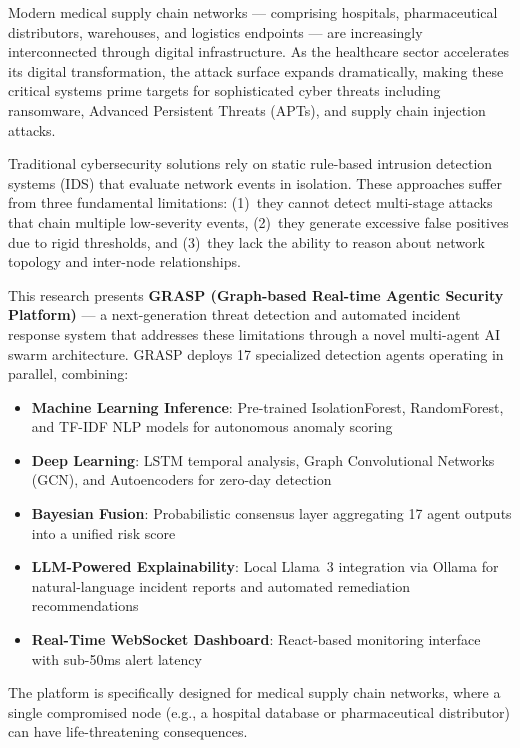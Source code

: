 \documentclass[12pt, a4paper]{report}
\begin{document}
Modern medical supply chain networks — comprising hospitals, pharmaceutical distributors, warehouses, and logistics endpoints — are increasingly interconnected through digital infrastructure. As the healthcare sector accelerates its digital transformation, the attack surface expands dramatically, making these critical systems prime targets for sophisticated cyber threats including ransomware, Advanced Persistent Threats (APTs), and supply chain injection attacks.

Traditional cybersecurity solutions rely on static rule-based intrusion detection systems (IDS) that evaluate network events in isolation. These approaches suffer from three fundamental limitations: (1)~they cannot detect multi-stage attacks that chain multiple low-severity events, (2)~they generate excessive false positives due to rigid thresholds, and (3)~they lack the ability to reason about network topology and inter-node relationships.

This research presents \textbf{GRASP (Graph-based Real-time Agentic Security Platform)} — a next-generation threat detection and automated incident response system that addresses these limitations through a novel multi-agent AI swarm architecture. GRASP deploys 17 specialized detection agents operating in parallel, combining:

\begin{itemize}
    \item \textbf{Machine Learning Inference}: Pre-trained IsolationForest, RandomForest, and TF-IDF NLP models for autonomous anomaly scoring
    \item \textbf{Deep Learning}: LSTM temporal analysis, Graph Convolutional Networks (GCN), and Autoencoders for zero-day detection
    \item \textbf{Bayesian Fusion}: Probabilistic consensus layer aggregating 17 agent outputs into a unified risk score
    \item \textbf{LLM-Powered Explainability}: Local Llama~3 integration via Ollama for natural-language incident reports and automated remediation recommendations
    \item \textbf{Real-Time WebSocket Dashboard}: React-based monitoring interface with sub-50ms alert latency
\end{itemize}

The platform is specifically designed for medical supply chain networks, where a single compromised node (e.g., a hospital database or pharmaceutical distributor) can have life-threatening consequences.
\end{document}
